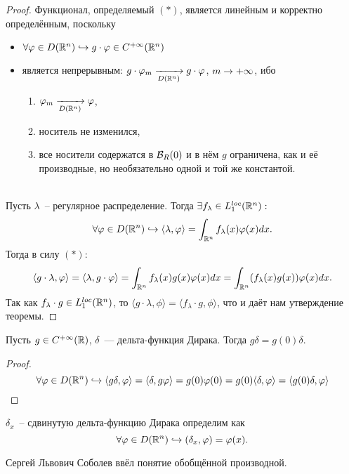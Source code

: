 \begin{proof} Функционал, определяемый $(\ast)$, является линейным и корректно определённым, поскольку
    \begin{itemize}
        \item $\forall \varphi \in D(\mathbb{R}^n) \hookrightarrow g \cdot \varphi \in C^{+\infty}(\mathbb{R}^n)$
        \item является непрерывным: $g \cdot\varphi_m \xrightarrow[D(\mathbb{R}^n)]{} g \cdot \varphi$, $m \rightarrow +\infty$, ибо  
        \begin{enumerate}
            \item $\varphi_m \xrightarrow[D(\mathbb{R}^n)]{} \varphi$,
            \item носитель не изменился,
            \item все носители содержатся в $\mathcal{B}_R(0)$ и в нём $g$ ограничена, как и её производные, но необязательно одной и той же константой.
        \end{enumerate}
    \end{itemize}\\
    Пусть $\lambda$~-- регулярное распределение.
    Тогда $\exists f_\lambda \in L_1^{loc}(\mathbb{R}^n):$ 
    \[
        \forall \varphi \in D(\mathbb{R}^n) \hookrightarrow \langle \lambda, \varphi \rangle = \int_{\mathbb{R}^n} f_{\lambda}(x) \varphi(x) dx.
    \]
    Тогда в силу $(\ast)$:
    \[
        \langle g \cdot \lambda, \varphi \rangle = \langle\lambda, g \cdot \varphi \rangle = \int_{\mathbb{R}^n} f_{\lambda}(x) g(x) \varphi(x) dx = \int_{\mathbb{R}^n} (f_\lambda(x) g(x))\varphi(x)dx.
    \]
    Так как $f_\lambda \cdot g \in L_1^{loc}(\mathbb{R}^n)$, то $\langle g \cdot \lambda, \phi \rangle  = \langle f_\lambda \cdot g, \phi \rangle $, что и даёт нам утверждение теоремы.
\end{proof}
\begin{example}
    Пусть $g \in C^{+\infty}(\mathbb{R})$, $\delta$~--- дельта-функция Дирака. Тогда $g\delta = g(0)\delta$.
    \begin{proof}
        \[ \forall \varphi \in D(\mathbb{R}^n) \hookrightarrow
        \langle g \delta, \varphi \rangle  = \langle \delta, g \varphi \rangle = g(0)\varphi(0) = g(0) \langle \delta, \varphi \rangle = \langle g(0)\delta, \varphi \rangle 
        \]
    \end{proof} 
\end{example}
\begin{definition}
    $\delta_x$~-- сдвинутую дельта-функцию Дирака определим как
    \[
        \forall \varphi \in D(\mathbb{R}^n) \hookrightarrow (\delta_x, \varphi) = \varphi(x).
    \]
\end{definition}
\begin{remark}
     Сергей Львович Соболев ввёл понятие обобщённой производной.
\end{remark}
